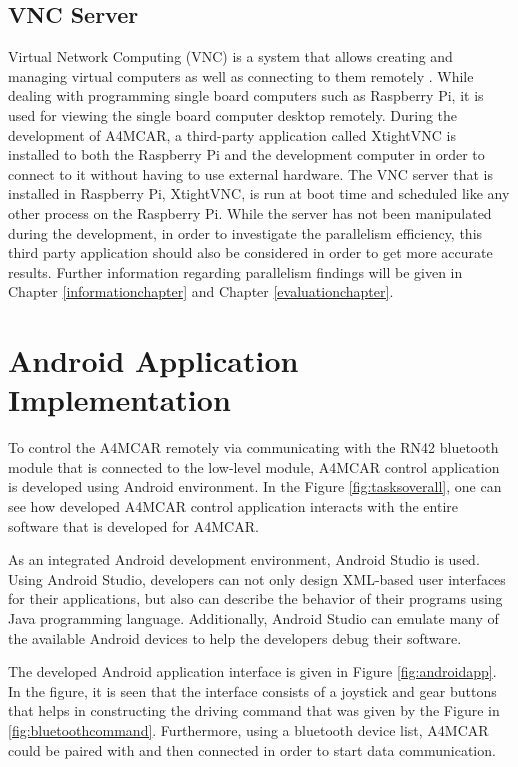 \subsection{VNC Server}
Virtual Network Computing (VNC) is a system that allows creating and managing virtual computers as well as connecting to them remotely \cite{vncmagazine}. While dealing with programming single board computers such as Raspberry Pi, it is used for viewing the single board computer desktop remotely. During the development of A4MCAR, a third-party application called XtightVNC is installed to both the Raspberry Pi and the development computer in order to connect to it without having to use external hardware.  The VNC server that is installed in Raspberry Pi, XtightVNC, is run at boot time and scheduled like any other process on the Raspberry Pi. While the server has not been manipulated during the development, in order to investigate the parallelism efficiency, this third party application should also be considered in order to get more accurate results. Further information regarding parallelism findings will be given in Chapter \ref{informationchapter} and Chapter \ref{evaluationchapter}. 

\section{Android Application Implementation}
To control the A4MCAR remotely via communicating with the RN42 bluetooth module that is connected to the low-level module, A4MCAR control application is developed using Android \cite{androidwebsite} environment. In the Figure \ref{fig:tasksoverall}, one can see how developed A4MCAR control application interacts with the entire software that is developed for A4MCAR. 

As an integrated Android development environment, Android Studio \cite{androidstudio} is used. Using Android Studio, developers can not only design XML-based user interfaces for their applications, but also can describe the behavior of their programs using Java programming language. Additionally, Android Studio can emulate many of the available Android devices to help the developers debug their software. 

The developed Android application interface is given in Figure \ref{fig:androidapp}. In the figure, it is seen that the interface consists of a joystick and gear buttons that helps in constructing the driving command that was given by the Figure in \ref{fig:bluetoothcommand}. Furthermore, using a bluetooth device list, A4MCAR could be paired with and then connected in order to start data communication.

